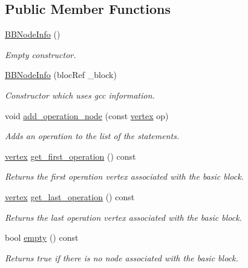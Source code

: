 \subsection*{Public Member Functions}
\begin{DoxyCompactItemize}
\item 
\hyperlink{structBBNodeInfo_a723cf7c7bc69baf4b23553951df9f949}{B\+B\+Node\+Info} ()
\begin{DoxyCompactList}\small\item\em Empty constructor. \end{DoxyCompactList}\item 
\hyperlink{structBBNodeInfo_a68cd849a452fa046ebe832ae6682dc74}{B\+B\+Node\+Info} (bloc\+Ref \+\_\+block)
\begin{DoxyCompactList}\small\item\em Constructor which uses gcc information. \end{DoxyCompactList}\item 
void \hyperlink{structBBNodeInfo_a837355045673c67780f13ebb70eca2c0}{add\+\_\+operation\+\_\+node} (const \hyperlink{graph_8hpp_abefdcf0544e601805af44eca032cca14}{vertex} op)
\begin{DoxyCompactList}\small\item\em Adds an operation to the list of the statements. \end{DoxyCompactList}\item 
\hyperlink{graph_8hpp_abefdcf0544e601805af44eca032cca14}{vertex} \hyperlink{structBBNodeInfo_ad6f05340841980bf4e373f226f82be23}{get\+\_\+first\+\_\+operation} () const
\begin{DoxyCompactList}\small\item\em Returns the first operation vertex associated with the basic block. \end{DoxyCompactList}\item 
\hyperlink{graph_8hpp_abefdcf0544e601805af44eca032cca14}{vertex} \hyperlink{structBBNodeInfo_a4a5d501afc8153738187ea681a0d14ad}{get\+\_\+last\+\_\+operation} () const
\begin{DoxyCompactList}\small\item\em Returns the last operation vertex associated with the basic block. \end{DoxyCompactList}\item 
bool \hyperlink{structBBNodeInfo_aecee6ebacff5a3995739e889c0a35c1a}{empty} () const
\begin{DoxyCompactList}\small\item\em Returns true if there is no node associated with the basic block. \end{DoxyCompactList}\item 

\end{DoxyCompactItemize}
